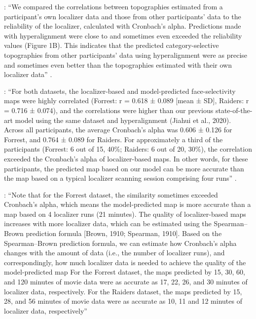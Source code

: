 %
\citep{jiahui2022cross}: ``We compared the correlations between topographies
estimated from a participant's own localizer data and those from other
participants' data to the reliability of the localizer, calculated with
Cronbach's alpha.
%
Predictions made with hyperalignment were close to and sometimes even exceeded
the reliability values (Figure 1B).
%
This indicates that the predicted category-selective topographies from other
participants' data using hyperalignment were as precise and sometimes even
better than the topographies estimated with their own localizer data''
\citep{jiahui2022cross}.

%
\citep{feilong2022individualized}: ``For both datasets, the localizer-based and
model-predicted face-selectivity maps were highly correlated (Forrest: r = 0.618
± 0.089 [mean ± SD], Raiders: r = 0.716 ± 0.074), and the correlations were
higher than our previous state-of-the-art model using the same dataset and
hyperalignment (Jiahui et al., 2020).
%
Across all participants, the average Cronbach's alpha was 0.606 ± 0.126 for
Forrest, and 0.764 ± 0.089 for Raiders.
%
For approximately a third of the participants (Forrest: 6 out of 15, 40\%;
Raiders: 6 out of 20, 30\%), the correlation exceeded the Cronbach's alpha of
localizer-based maps.
%
In other words, for these participants, the predicted map based on our model can
be more accurate than the map based on a typical localizer scanning session
comprising four runs'' \citep{feilong2022individualized}.

%
\citep{feilong2022individualized}: ``Note that for the Forrest dataset, the
similarity sometimes exceeded Cronbach's alpha, which means the model-predicted
map is more accurate than a map based on 4 localizer runs (21 minutes).
%
The quality of localizer-based maps increases with more localizer data, which
can be estimated using the Spearman–Brown prediction formula [Brown, 1910;
Spearman, 1910].
%
Based on the Spearman–Brown prediction formula, we can estimate how Cronbach's
alpha changes with the amount of data (i.e., the number of localizer runs), and
correspondingly, how much localizer data is needed to achieve the quality of the
model-predicted map
%
For the Forrest dataset, the maps predicted by 15, 30, 60, and 120 minutes of
movie data were as accurate as 17, 22, 26, and 30 minutes of localizer data,
respectively.
%
For the Raiders dataset, the maps predicted by 15, 28, and 56 minutes of movie
data were as accurate as 10, 11 and 12 minutes of localizer data, respectively''
\citep{feilong2022individualized}

